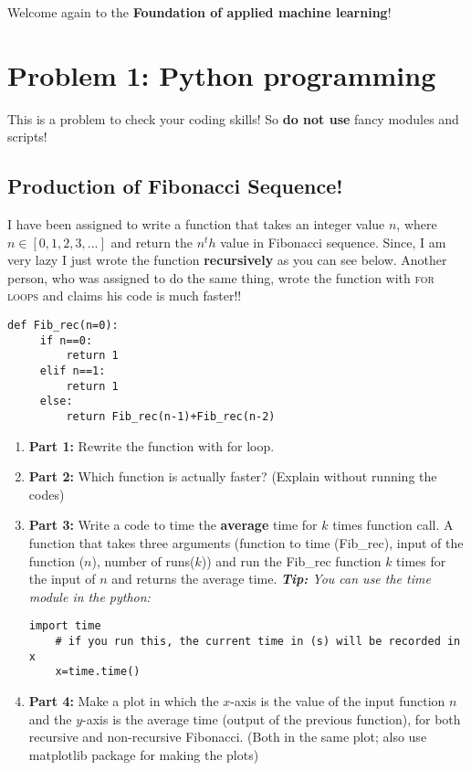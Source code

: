 \documentclass[12pt,letterpaper]{article}
\begin{document}
Welcome again to the \textbf{Foundation of applied machine learning}! 

\section*{Problem 1: Python programming}
This is a problem to check your coding skills! So \textbf{do not use} fancy modules and scripts!  

\subsection*{Production of Fibonacci Sequence!}
I have been assigned to write a function that takes an integer value $n$, where $n\in [0,1,2,3,...]$ and return the $n^th$ value in Fibonacci sequence. Since, I am very lazy I just wrote the function \textbf{recursively} as you can see below. Another person, who was assigned to do the same thing, wrote the function with \textsc{for loops} and claims his code is much faster!! 

     \begin{lstlisting}[style = Python]
     def Fib_rec(n=0):
     if n==0:
         return 1
     elif n==1:
         return 1
     else:
         return Fib_rec(n-1)+Fib_rec(n-2)
    \end{lstlisting}


\begin{enumerate}
  \item
   \textbf{Part 1:} Rewrite the function with for loop.
  \item
   \textbf{Part 2:} Which function is actually faster? (Explain without running the codes)
  \item
   \textbf{Part 3:} Write a code to time the \textbf{average} time for $k$ times function call. A function that takes three arguments (function to time (Fib\_rec), input of the function ($n$), number of runs($k$)) and run the Fib\_rec function $k$ times for the input of $n$ and returns the average time.
   \textit{\textbf{Tip:} You can use the time module in the python:}
    \begin{lstlisting}[style = Python]
    import time
    # if you run this, the current time in (s) will be recorded in  x
    x=time.time() 
    \end{lstlisting}
  \item
   \textbf{Part 4:} Make a plot in which the $x$-axis is the value of the input function $n$ and the $y$-axis is the average time (output of the previous function), for both recursive and non-recursive Fibonacci. (Both in the same plot; also use matplotlib package for making the plots) 
\end{enumerate}
\end{document}
